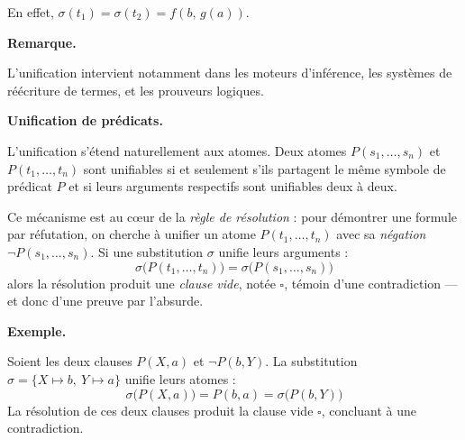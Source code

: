 \documentclass[11pt]{article}
\newenvironment{remarque}{%
    \begin{mdframed}[
        linecolor=sectioncolor!40,
        linewidth=0.8pt,
        backgroundcolor=sectioncolor!5,
        innerleftmargin=10pt,
        innerrightmargin=10pt,
        innertopmargin=6pt,
        innerbottommargin=6pt,
        skipabove=8pt,
        skipbelow=8pt
    ]
    \noindent\textbf{\small\color{sectioncolor}Remarque.}\enspace\small\itshape
}{%
    \end{mdframed}
}
\begin{document}
En effet, $\sigma(t_1) = \sigma(t_2) = f(b,\, g(a))$.
\vspace{0.4cm}

\begin{remarque}
 L'unification intervient notamment dans les
moteurs d'inférence, les systèmes de réécriture de termes, et les prouveurs logiques.   
\end{remarque}

\vspace{0.4cm}
\noindent\textbf{Unification de prédicats.}

\vspace{0.2cm}
L'unification s'étend naturellement aux atomes. Deux atomes $P(s_1, \ldots, s_n)$ et
$P(t_1, \ldots, t_n)$ sont unifiables si et seulement s'ils partagent le même symbole
de prédicat $P$ et si leurs arguments respectifs sont unifiables deux à deux.

\vspace{0.4cm}
Ce mécanisme est au cœur de la \textit{règle de résolution} : pour démontrer une
formule par réfutation, on cherche à unifier un atome $P(t_1, \ldots, t_n)$ avec
sa \textit{négation} $\neg P(s_1, \ldots, s_n)$. Si une substitution $\sigma$ unifie
leurs arguments :
$$\sigma\bigl(P(t_1, \ldots, t_n)\bigr) = \sigma\bigl(P(s_1, \ldots, s_n)\bigr)$$
alors la résolution produit une \textit{clause vide}, notée $\square$, témoin d'une
contradiction — et donc d'une preuve par l'absurde.

\vspace{0.2cm}
\noindent\textbf{Exemple.}

\vspace{0.2cm}
\begin{exemple}
    Soient les deux clauses $P(X, a)$ et $\neg P(b, Y)$. La substitution
    $\sigma = \{X \mapsto b,\ Y \mapsto a\}$ unifie leurs atomes :
    $$\sigma\bigl(P(X, a)\bigr) = P(b, a) = \sigma\bigl(P(b, Y)\bigr)$$
    La résolution de ces deux clauses produit la clause vide $\square$, concluant
    à une contradiction.
\end{exemple}
\end{document}
